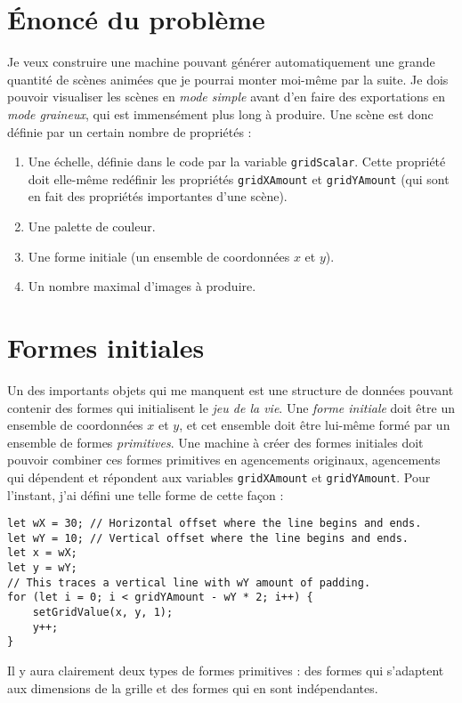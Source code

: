 
\section{Énoncé du problème}
\noindent Je veux construire une machine pouvant générer automatiquement une grande quantité de scènes animées que je pourrai monter moi-même par la suite. Je dois pouvoir visualiser les scènes en \textit{mode simple} avant d'en faire des exportations en \textit{mode graineux}, qui est immensément plus long à produire. Une scène est donc définie par un certain nombre de propriétés : 

\begin{enumerate}
\item Une échelle, définie dans le code par la variable \lstinline|gridScalar|. Cette propriété doit elle-même redéfinir les propriétés \lstinline|gridXAmount| et \lstinline|gridYAmount| (qui sont en fait des propriétés importantes d'une scène).
\item Une palette de couleur.
\item Une forme initiale (un ensemble de coordonnées $x$ et $y$).
\item Un nombre maximal d'images à produire.

\end{enumerate}

\section{Formes initiales}
\noindent Un des importants objets qui me manquent est une structure de données pouvant contenir des formes qui initialisent le \textit{jeu de la vie}. Une \textit{forme initiale} doit être un ensemble de coordonnées $x$ et $y$, et cet ensemble doit être lui-même formé par un ensemble de formes \textit{primitives}. Une machine à créer des formes initiales doit pouvoir combiner ces formes primitives en agencements originaux, agencements qui dépendent et répondent aux variables \lstinline|gridXAmount| et \lstinline|gridYAmount|. Pour l'instant, j'ai défini une telle forme de cette façon :
\begin{lstlisting}
let wX = 30; // Horizontal offset where the line begins and ends.
let wY = 10; // Vertical offset where the line begins and ends.
let x = wX;
let y = wY;
// This traces a vertical line with wY amount of padding.
for (let i = 0; i < gridYAmount - wY * 2; i++) {
    setGridValue(x, y, 1);
    y++;
}
\end{lstlisting}
\noindent Il y aura clairement deux types de formes primitives : des formes qui s'adaptent aux dimensions de la grille et des formes qui en sont indépendantes.